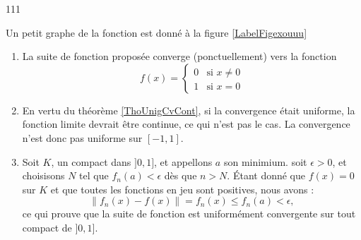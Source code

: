 

\begin{corrige}{111}

Un petit graphe de la fonction est donné à la figure \ref{LabelFigexouuu}
\newcommand{\CaptionFigexouuu}{Quelque unes des fonctions $f_n$.}


\begin{enumerate}
\item 

La suite de fonction proposée converge (ponctuellement) vers la fonction
\begin{equation}
	f(x)=
\begin{cases}
	0	&	\text{si $x\neq 0$}\\
	1	&	 \text{si $x=0$}
\end{cases}
\end{equation}
\item En vertu du théorème \ref{ThoUnigCvCont}, si la convergence était uniforme, la fonction limite devrait être continue, ce qui n'est pas le cas. La convergence n'est donc pas uniforme sur $[-1,1]$.

\item

Soit $K$, un compact dans $]0,1]$, et appellons $a$ son minimium. soit $\epsilon>0$, et choisisons $N$ tel que $f_n(a)<\epsilon$ dès que $n>N$. Étant donné que $f(x)=0$ sur $K$ et que toutes les fonctions en jeu sont positives, nous avons :
\begin{equation}
	\| f_n(x)-f(x) \|=f_n(x)\leq f_n(a)<\epsilon,
\end{equation}
ce qui prouve que la suite de fonction est uniformément convergente sur tout compact de $]0,1]$.

\end{enumerate}

\end{corrige}



